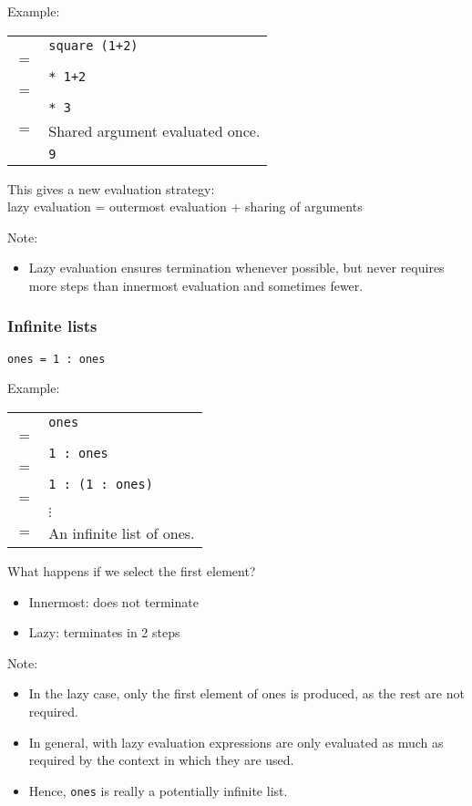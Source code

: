 \begin{multicols}{2}
Example:\\
\begin{tabularx}{\linewidth}{lX}
  & \lstinline{square (1+2)}\\
  \(=\) & \\
  & \lstinline{* 1+2}\\
  \(=\) & \\
  & \lstinline{* 3}\\
  \(=\) & \tiny{Shared argument evaluated once.}\\
  & \lstinline{9}\\
\end{tabularx}

This gives a new evaluation strategy:\\
lazy evaluation = outermost evaluation \(+\) sharing of arguments

Note:
\begin{itemize}
  \item Lazy evaluation ensures termination whenever possible, but never requires more steps than innermost evaluation and sometimes fewer.
\end{itemize}

\subsubsection{Infinite lists}
\begin{lstlisting}
ones = 1 : ones
\end{lstlisting}

Example:
\begin{tabularx}{\linewidth}{lX}
  & \lstinline{ones}\\
  \(=\) & \\
  & \lstinline{1 : ones}\\
  \(=\) & \\
  & \lstinline{1 : (1 : ones)}\\
  \(=\) & \\
  & \(\vdots\)\\
  \(=\) & \tiny{An infinite list of ones.}\\
\end{tabularx}

What happens if we select the first element?
\begin{itemize}
  \item Innermost: does not terminate
  \item Lazy: terminates in 2 steps
\end{itemize}

Note:
\begin{itemize}
  \item In the lazy case, only the first element of ones is produced, as the rest are not required.
  \item In general, with lazy evaluation expressions are only evaluated as much as required by the context in which they are used.
  \item Hence, \lstinline{ones} is really a potentially infinite list.
\end{itemize}


\end{multicols}
